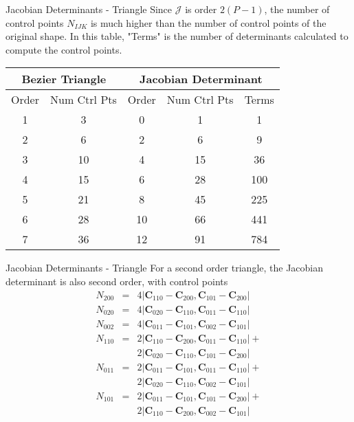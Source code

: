 \documentclass[12pt]{beamer}
\begin{document}
\begin{frame}{Jacobian Determinants - Triangle}
Since $\mathcal{J}$ is order $2(P-1)$, the number of control points $N_{IJK}$ is much higher than the number of control points of the original shape. In this table, "Terms" is the number of determinants calculated to compute the control points.

\begin{tabular}{|cc|ccc|}
\hline \multicolumn{2}{|c|}{Bezier Triangle} & \multicolumn{3}{|c|}{Jacobian Determinant} \\ \hline
Order & Num Ctrl Pts & Order & Num Ctrl Pts & Terms \\ 
\hline 1 & 3 & 0 & 1 & 1 \\
2 & 6 & 2 & 6 & 9 \\
3 & 10 & 4 & 15 & 36 \\
4 & 15 & 6 & 28 & 100 \\
5 & 21 & 8 & 45 & 225 \\
6 & 28 & 10 & 66 & 441 \\
7 & 36 & 12 & 91 & 784 \\ \hline
\end{tabular}
\end{frame}

\begin{frame}{Jacobian Determinants - Triangle}
For a second order triangle, the Jacobian determinant is also second order, with control points
\begin{eqnarray*}
N_{200}&=&4\left|\mathbf{C}_{110}-\mathbf{C}_{200},\mathbf{C}_{101}-\mathbf{C}_{200}\right|
\\N_{020}&=&4\left|\mathbf{C}_{020}-\mathbf{C}_{110},\mathbf{C}_{011}-\mathbf{C}_{110}\right|
\\N_{002}&=&4\left|\mathbf{C}_{011}-\mathbf{C}_{101},\mathbf{C}_{002}-\mathbf{C}_{101}\right|
\\N_{110}&=&2\left|\mathbf{C}_{110}-\mathbf{C}_{200},\mathbf{C}_{011}-\mathbf{C}_{110}\right|+\\&&2\left|\mathbf{C}_{020}-\mathbf{C}_{110},\mathbf{C}_{101}-\mathbf{C}_{200}\right|
\\N_{011}&=&2\left|\mathbf{C}_{011}-\mathbf{C}_{101},\mathbf{C}_{011}-\mathbf{C}_{110}\right|+\\&&2\left|\mathbf{C}_{020}-\mathbf{C}_{110},\mathbf{C}_{002}-\mathbf{C}_{101}\right|
\\N_{101}&=&2\left|\mathbf{C}_{011}-\mathbf{C}_{101},\mathbf{C}_{101}-\mathbf{C}_{200}\right|+\\&&2\left|\mathbf{C}_{110}-\mathbf{C}_{200},\mathbf{C}_{002}-\mathbf{C}_{101}\right|
\end{eqnarray*}
\end{frame}
\end{document}
